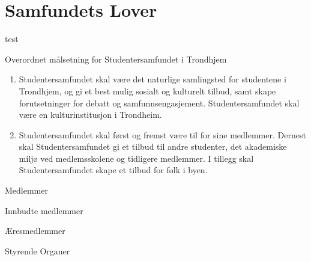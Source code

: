 
\chapter*{Samfundets Lover}

\begin{lovkapittel}{test}

\begin{lovparagraf}{Overordnet målsetning for Studentersamfundet i Trondhjem}

    \begin{enumerate}
        \item Studentersamfundet skal være det naturlige samlingsted for studentene i Trondhjem, og gi
            et best mulig sosialt og kulturelt tilbud, samt skape forutsetninger for debatt og
            samfunnsengasjement. Studentersamfundet skal være en kulturinstitusjon i Trondheim.
        \item Studentersamfundet skal først og fremst være til for sine medlemmer. Dernest
            skal Studentersamfundet gi et tilbud til andre studenter, det akademiske miljø
            ved medlemsskolene og tidligere medlemmer. I tillegg skal Studentersamfundet
            skape et tilbud for folk i byen.
    \end{enumerate}
\end{lovparagraf}





\begin{lovparagraf}{Medlemmer}

\end{lovparagraf}


\begin{lovparagraf}{Innbudte medlemmer}

\end{lovparagraf}


\begin{lovparagraf}{Æresmedlemmer}

\end{lovparagraf}

\end{lovkapittel}

\begin{lovkapittel}{Styrende Organer}




\end{lovkapittel}
